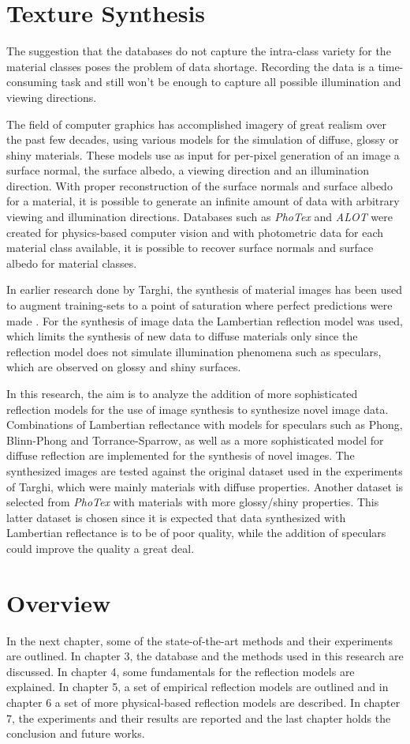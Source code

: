 \section{Texture Synthesis}
The suggestion that the databases do not capture the intra-class variety for the material classes poses the problem of data shortage. Recording the data is a time-consuming task and still won't be enough to capture all possible illumination and viewing directions. 

The field of computer graphics has accomplished imagery of great realism over the past few decades, using various models for the simulation of diffuse, glossy or shiny materials. These models use as input for per-pixel generation of an image a surface normal, the surface albedo, a viewing direction and an illumination direction. With proper reconstruction of the surface normals and surface albedo for a material, it is possible to generate an infinite amount of data with arbitrary viewing and illumination directions. Databases such as {\it PhoTex} and {\it ALOT} were created for physics-based computer vision and with photometric data for each material class available, it is possible to recover surface normals and surface albedo for material classes. 

In earlier research done by Targhi, the synthesis of material images has been used to augment training-sets to a point of saturation where perfect predictions were made \cite{Targhi}. For the synthesis of image data the Lambertian reflection model was used, which limits the synthesis of new data to diffuse materials only since the reflection model does not simulate illumination phenomena such as speculars, which are observed on glossy and shiny surfaces.

In this research, the aim is to analyze the addition of more sophisticated reflection models for the use of image synthesis to synthesize novel image data. Combinations of Lambertian reflectance with models for speculars such as Phong, Blinn-Phong and Torrance-Sparrow, as well as a more sophisticated model for diffuse reflection are implemented for the synthesis of novel images. The synthesized images are tested against the original dataset used in the experiments of Targhi, which were mainly materials with diffuse properties. Another dataset is selected from {\it PhoTex} with materials with more glossy/shiny properties. This latter dataset is chosen since it is expected that data synthesized with Lambertian reflectance is to be of poor quality, while the addition of speculars could improve the quality a great deal.

\section{Overview}
In the next chapter, some of the state-of-the-art methods and their experiments are outlined. In chapter 3, the database and the methods used in this research are discussed. In chapter 4, some fundamentals for the reflection models are explained. In chapter 5, a set of empirical reflection models are outlined and in chapter 6 a set of more physical-based reflection models are described. In chapter 7, the experiments and their results are reported and the last chapter holds the conclusion and future works.

